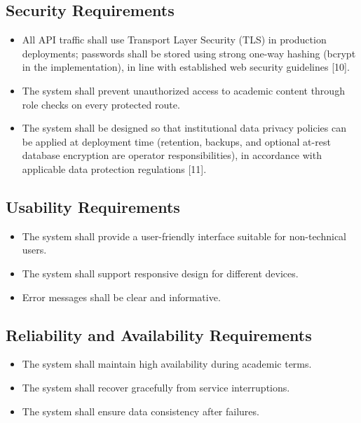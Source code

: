 \documentclass[12pt, a4paper, oneside]{report}
\let\oldsubsection\subsection
\renewcommand{\subsection}{%
  \addtocontents{toc}{\protect\needspace{3\baselineskip}}%
  \oldsubsection
}
\begin{document}
\subsection{Security Requirements}

\begin{itemize}
  \item All API traffic shall use Transport Layer Security (TLS) in production deployments; passwords shall be stored using strong one-way hashing (bcrypt in the implementation), in line with established web security guidelines [10].
  \item The system shall prevent unauthorized access to academic content through role checks on every protected route.
  \item The system shall be designed so that institutional data privacy policies can be applied at deployment time (retention, backups, and optional at-rest database encryption are operator responsibilities), in accordance with applicable data protection regulations [11].
\end{itemize}

\subsection{Usability Requirements}

\begin{itemize}
  \item The system shall provide a user-friendly interface suitable for non-technical users.
  \item The system shall support responsive design for different devices.
  \item Error messages shall be clear and informative.
\end{itemize}

\subsection{Reliability and Availability Requirements}

\begin{itemize}
  \item The system shall maintain high availability during academic terms.
  \item The system shall recover gracefully from service interruptions.
  \item The system shall ensure data consistency after failures.
\end{itemize}
\end{document}
